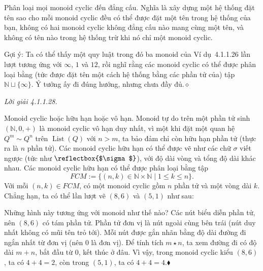 Phân loại mọi monoid cyclic đến đẳng cấu. Nghĩa là xây dựng một hệ thống đặt tên sao cho mỗi monoid cyclic đều có thể được đặt một tên trong hệ thống của bạn, không có hai monoid cyclic không đẳng cấu nào mang cùng một tên, và không có tên nào trong hệ thống trừ khi nó chỉ một monoid cyclic.

Gợi ý: Ta có thể thấy một quy luật trong đó ba monoid của Ví dụ~4.1.1.26 lần lượt tương ứng với $\infty$, $1$ và $12$, rồi nghĩ rằng các monoid cyclic có thể được phân loại bằng (tức được đặt tên một cách hệ thống bằng các phần tử của) tập $\mathbb{N}\sqcup\{\infty\}$. Ý tưởng ấy đi đúng hướng, nhưng chưa đầy đủ.\hfill$\diamond$

\noindent\textit{Lời giải 4.1.1.28.}\keepwithnext

Monoid cyclic hoặc hữu hạn hoặc vô hạn. Monoid tự do trên một phần tử sinh $(\mathbb{N},0,+)$ là monoid cyclic vô hạn duy nhất, vì một khi đặt một quan hệ $Q^m\sim Q^n$ trên $\operatorname{List}(Q)$ với $n>m$, ta bảo đảm chỉ còn hữu hạn phần tử (thực ra là $n$ phần tử). Các monoid cyclic hữu hạn có thể được vẽ như các chữ $\sigma$ viết ngược (tức như $\reflectbox{$\sigma$}$), với độ dài vòng và tổng độ dài khác nhau. Các monoid cyclic hữu hạn có thể được phân loại bằng tập
\[
FCM:=\{(n,k)\in\mathbb{N}\times\mathbb{N}\mid1\le k\le n\}.
\]
Với mỗi $(n,k)\in FCM$, có một monoid cyclic gồm $n$ phần tử và một vòng dài $k$. Chẳng hạn, ta có thể lần lượt vẽ $(8,6)$ và $(5,1)$ như sau:
\begin{center}
\end{center}
Những hình này tương ứng với monoid như thế nào? Các nút biểu diễn phần tử, nên $(8,6)$ có tám phần tử. Phần tử đơn vị là nút ngoài cùng bên trái (nút duy nhất không có mũi tên trỏ tới). Mỗi nút được gắn nhãn bằng độ dài đường đi ngắn nhất từ đơn vị (nên $0$ là đơn vị). Để tính tích $m\star n$, ta xem đường đi có độ dài $m+n$, bắt đầu từ $0$, kết thúc ở đâu. Vì vậy, trong monoid cyclic kiểu $(8,6)$, ta có $4+4=2$, còn trong $(5,1)$, ta có $4+4=4$.\hfill$\blacklozenge$

